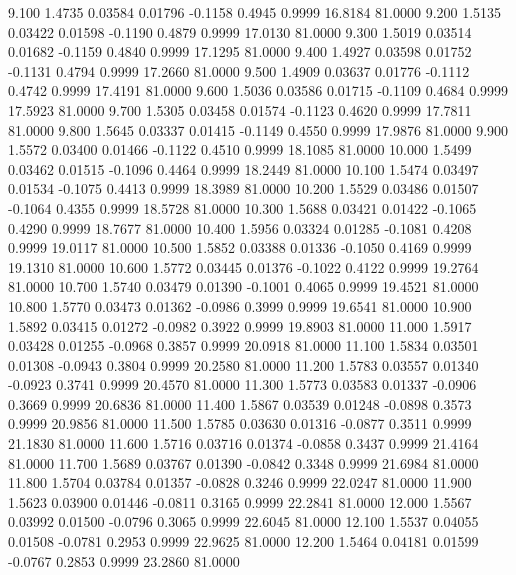    9.100   1.4735   0.03584   0.01796  -0.1158   0.4945   0.9999  16.8184  81.0000
   9.200   1.5135   0.03422   0.01598  -0.1190   0.4879   0.9999  17.0130  81.0000
   9.300   1.5019   0.03514   0.01682  -0.1159   0.4840   0.9999  17.1295  81.0000
   9.400   1.4927   0.03598   0.01752  -0.1131   0.4794   0.9999  17.2660  81.0000
   9.500   1.4909   0.03637   0.01776  -0.1112   0.4742   0.9999  17.4191  81.0000
   9.600   1.5036   0.03586   0.01715  -0.1109   0.4684   0.9999  17.5923  81.0000
   9.700   1.5305   0.03458   0.01574  -0.1123   0.4620   0.9999  17.7811  81.0000
   9.800   1.5645   0.03337   0.01415  -0.1149   0.4550   0.9999  17.9876  81.0000
   9.900   1.5572   0.03400   0.01466  -0.1122   0.4510   0.9999  18.1085  81.0000
  10.000   1.5499   0.03462   0.01515  -0.1096   0.4464   0.9999  18.2449  81.0000
  10.100   1.5474   0.03497   0.01534  -0.1075   0.4413   0.9999  18.3989  81.0000
  10.200   1.5529   0.03486   0.01507  -0.1064   0.4355   0.9999  18.5728  81.0000
  10.300   1.5688   0.03421   0.01422  -0.1065   0.4290   0.9999  18.7677  81.0000
  10.400   1.5956   0.03324   0.01285  -0.1081   0.4208   0.9999  19.0117  81.0000
  10.500   1.5852   0.03388   0.01336  -0.1050   0.4169   0.9999  19.1310  81.0000
  10.600   1.5772   0.03445   0.01376  -0.1022   0.4122   0.9999  19.2764  81.0000
  10.700   1.5740   0.03479   0.01390  -0.1001   0.4065   0.9999  19.4521  81.0000
  10.800   1.5770   0.03473   0.01362  -0.0986   0.3999   0.9999  19.6541  81.0000
  10.900   1.5892   0.03415   0.01272  -0.0982   0.3922   0.9999  19.8903  81.0000
  11.000   1.5917   0.03428   0.01255  -0.0968   0.3857   0.9999  20.0918  81.0000
  11.100   1.5834   0.03501   0.01308  -0.0943   0.3804   0.9999  20.2580  81.0000
  11.200   1.5783   0.03557   0.01340  -0.0923   0.3741   0.9999  20.4570  81.0000
  11.300   1.5773   0.03583   0.01337  -0.0906   0.3669   0.9999  20.6836  81.0000
  11.400   1.5867   0.03539   0.01248  -0.0898   0.3573   0.9999  20.9856  81.0000
  11.500   1.5785   0.03630   0.01316  -0.0877   0.3511   0.9999  21.1830  81.0000
  11.600   1.5716   0.03716   0.01374  -0.0858   0.3437   0.9999  21.4164  81.0000
  11.700   1.5689   0.03767   0.01390  -0.0842   0.3348   0.9999  21.6984  81.0000
  11.800   1.5704   0.03784   0.01357  -0.0828   0.3246   0.9999  22.0247  81.0000
  11.900   1.5623   0.03900   0.01446  -0.0811   0.3165   0.9999  22.2841  81.0000
  12.000   1.5567   0.03992   0.01500  -0.0796   0.3065   0.9999  22.6045  81.0000
  12.100   1.5537   0.04055   0.01508  -0.0781   0.2953   0.9999  22.9625  81.0000
  12.200   1.5464   0.04181   0.01599  -0.0767   0.2853   0.9999  23.2860  81.0000
